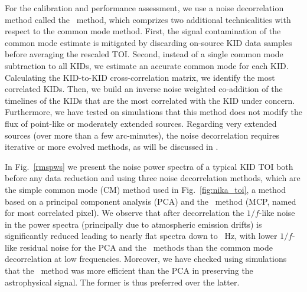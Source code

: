 {\lp For the calibration and performance assessment, we use a noise
decorrelation method called the \cmoneb\ method, which comprizes two
additional technicalities with respect to the common mode
method.} First, the signal contamination of the common mode estimate
is mitigated by discarding on-source KID data samples before averaging
the rescaled TOI. Second, instead of a single common mode subtraction to
all KIDs, we estimate an accurate common mode for each
KID. Calculating the KID-to-KID cross-correlation matrix, we
identify the most correlated KIDs. Then, we build an
inverse noise weighted co-addition of the timelines of the %
KIDs that are the most correlated with the KID under
concern. Furthermore, we have tested on simulations that this method
does not modify the flux of {\lp point-like or moderately extended
sources. Regarding very extended sources (over more
than a few arc-minutes), the noise decorrelation requires iterative or
more evolved methods, as will be discussed in \citet{Ponthieu2019}.}

In Fig.~\ref{rmspws} we present the noise power spectra of
a typical KID TOI both before any data reduction and using three noise
decorrelation methods, which are the simple common mode (CM) method
used in Fig.~\ref{fig:nika_toi}, a method based on a principal component
analysis (PCA) and the \cmoneb\ method (MCP, named for most correlated
pixel). We observe that after decorrelation the
$1/f$-like noise in the power spectra (principally due to atmospheric
emission drifts)
is significantly reduced leading to nearly flat spectra down to {~Hz}, with
lower $1/f$-like residual noise for the PCA and the \cmoneb\ methods
than the common mode decorrelation at low frequencies. {\lp Moreover, we
have checked using simulations that the \cmoneb\ method was more
efficient than the PCA in preserving the astrophysical signal. The
former is thus preferred over the latter.}\\ 


